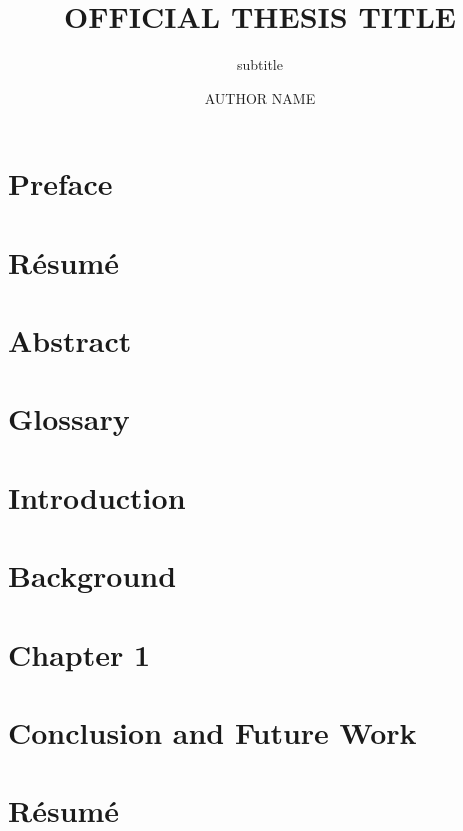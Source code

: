 \documentclass{eurecom/ntnuthesis}
\title{OFFICIAL THESIS TITLE}
\subtitle{subtitle}
\author{AUTHOR NAME}
\newcounter{nc}
\begin{document}
%
%
\frontmatter

\thispagestyle{empty}
\cleardoublepage
{}

%
%
\chapter*{Preface}

\newpage
\thispagestyle{empty}
%
%
\chapter*{R\'esum\'e}

%
%
\chapter*{Abstract}

\cleardoublepage

\newpage
\thispagestyle{empty}

%
%
\tableofcontents
{}

%
%
\listoffigures

%
%
\chapter*{Glossary}


\mainmatter

%
%

\chapter{Introduction}
\label{chap:introduction}


\chapter{Background}
\label{chap:background}


\chapter{Chapter 1}
\label{chap:chapter1}


\chapter{Conclusion and Future Work}
\label{chap:conclusion}


\chapter{Résumé}
\label{chap:summary_fr}


%
%
\backmatter
\appendix


%
%

\renewcommand{\bibname}{References}

\end{document}
